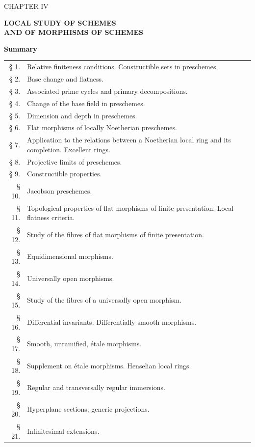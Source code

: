 \cleardoublepage

\thispagestyle{plain}

\begin{center}
{\Large CHAPTER IV}

\vspace{1.5cm}
{\LARGE\bfseries LOCAL STUDY OF SCHEMES\\[0.3em]
AND OF MORPHISMS OF SCHEMES}

\vspace{1.5cm}
{\large\bfseries Summary}
\end{center}

\medskip
\begin{tabular}{@{}r p{}}
§ 1. & Relative finiteness conditions. Constructible sets in preschemes.\\
§ 2. & Base change and flatness.\\
§ 3. & Associated prime cycles and primary decompositions.\\
§ 4. & Change of the base field in preschemes.\\
§ 5. & Dimension and depth in preschemes.\\
§ 6. & Flat morphisms of locally Noetherian preschemes.\\
§ 7. & Application to the relations between a Noetherian local ring and its completion.
Excellent rings.\\
§ 8. & Projective limits of preschemes.\\
§ 9. & Constructible properties.\\
§ 10. & Jacobson preschemes.\\
§ 11.\footnotemark[1] & Topological properties of flat morphisms of finite presentation.
Local flatness criteria.\\
§ 12. & Study of the fibres of flat morphisms of finite presentation.\\
§ 13. & Equidimensional morphisms.\\
§ 14. & Universally open morphisms.\\
§ 15. & Study of the fibres of a universally open morphism.\\
§ 16. & Differential invariants. Differentially smooth morphisms.\\
§ 17. & Smooth, unramified, étale morphisms.\\
§ 18. & Supplement on étale morphisms. Henselian local rings.\\
§ 19. & Regular and transversally regular immersions.\\
§ 20. & Hyperplane sections; generic projections.\\
§ 21. & Infinitesimal extensions.\\
\end{tabular}

